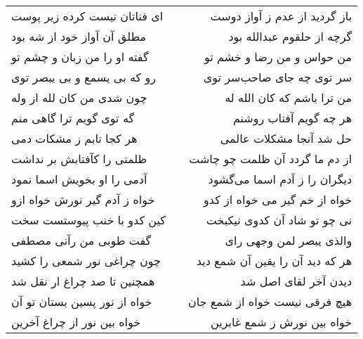 \begin{center}
\begin{longtable}{l p{0.5cm} r}
ای فناتان نیست کرده زیر پوست
&&
باز گردید از عدم ز آواز دوست
\\
مطلق آن آواز خود از شه بود
&&
گرچه از حلقوم عبدالله بود
\\
گفته او را من زبان و چشم تو
&&
من حواس و من رضا و خشم تو
\\
رو که بی یسمع و بی یبصر توی
&&
سر توی چه جای صاحب‌سر توی
\\
چون شدی من کان لله از وله
&&
من ترا باشم که کان الله له
\\
گه توی گویم ترا گاهی منم
&&
هر چه گویم آفتاب روشنم
\\
هر کجا تابم ز مشکات دمی
&&
حل شد آنجا مشکلات عالمی
\\
ظلمتی را کآفتابش بر نداشت
&&
از دم ما گردد آن ظلمت چو چاشت
\\
آدمی را او بخویش اسما نمود
&&
دیگران را ز آدم اسما می‌گشود
\\
خواه ز آدم گیر نورش خواه ازو
&&
خواه از خم گیر می خواه از کدو
\\
کین کدو با خنب پیوستست سخت
&&
نی چو تو شاد آن کدوی نیکبخت
\\
گفت طوبی من رآنی مصطفی
&&
والذی یبصر لمن وجهی رای
\\
چون چراغی نور شمعی را کشید
&&
هر که دید آن را یقین آن شمع دید
\\
همچنین تا صد چراغ ار نقل شد
&&
دیدن آخر لقای اصل شد
\\
خواه از نور پسین بستان تو آن
&&
هیچ فرقی نیست خواه از شمع جان
\\
خواه بین نور از چراغ آخرین
&&
خواه بین نورش ز شمع غابرین
\\
\end{longtable}
\end{center}
